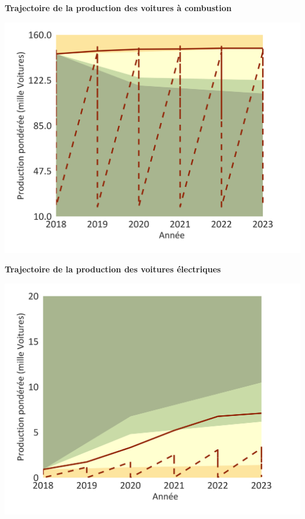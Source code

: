\documentclass[10pt,table,a4]{article}\usepackage[]{graphicx}\usepackage[]{color}
\begin{document}
	
	\begin{minipage}[t]{.49\linewidth}
	\begin{center}
		\textbf{Trajectoire de la production des voitures à combustion}
	\end{center}
		\includegraphics[trim = {0 0cm 0 0},width=1\linewidth]{ReportOutputs/Fig24}
		
	\end{minipage}	
	\hspace{.02\linewidth}
	\begin{minipage}[t]{.49\textwidth}
	\begin{center}
		\textbf{Trajectoire de la production des voitures électriques}
	\end{center}
		\includegraphics[trim = {0 0cm 0 0},width=1\linewidth]{ReportOutputs/Fig25}
		
	\end{minipage}	
	
\end{document}
